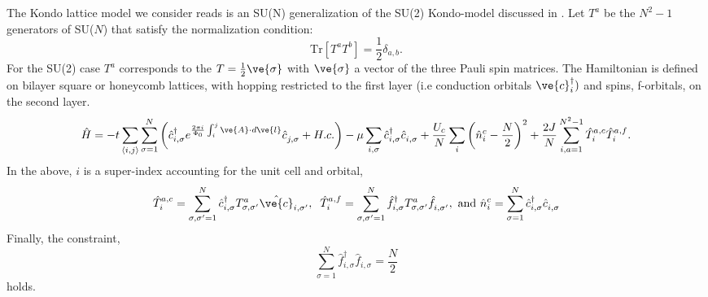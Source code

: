 

The Kondo lattice model we consider reads is an SU(N) generalization of the SU(2) Kondo-model   discussed in \cite{Capponi00,Assaad99a}.   Let 
$T^{a}$ be the  $N^2 -1  $ generators of SU($N$)   that  satisfy the normalization condition: 
\begin{equation}
	\text{Tr}  \left[ T^{a} T^{b} \right]   = \frac{1}{2}\delta_{a,b}.
\label{Normalization_condition.eq}
\end{equation}
For the SU(2) case $T^{a}$  corresponds to the $T  = \frac{1}{2} \ve{\sigma}$ with $\ve{\sigma}$   a vector of the three Pauli spin matrices.      The   Hamiltonian is defined on bilayer  square or honeycomb lattices, with  hopping restricted to the  first layer  (i.e  conduction orbitals $\ve{c}^{\dagger}_{i}  )$   and  spins, f-orbitals, on the second layer. 
\begin{equation}
	\hat{H}     =   - t  \sum_{\langle i,j \rangle}    \sum_{\sigma=1}^{N}  \left(  \hat{c}^{\dagger}_{i,\sigma}  e^{\frac{2\pi i}{\Phi_0}  \int_{i}^{j} \ve{A}\cdot d \ve{l}}\hat{c}^{\phantom\dagger}_{j,\sigma}   + H.c.  \right)  - \mu \sum_{i,\sigma} \hat{c}^{\dagger}_{i,\sigma}  \hat{c}^{\phantom\dagger}_{i,\sigma} 
	+    \frac{U_c}{N}  \sum_{i}   \left( \hat{n}^c_i -  \frac{N}{2} \right)^2  
         +  \frac{2 J}{N} \sum_{i, a=1  }^{N^2 -1}  \hat{T}^{a,c}_{i}  \hat{T}^{a,f}_{i}. 
\label{Kondo_SUN_Ham.eq}
\end{equation}
In the above,  $i$ is a super-index  accounting for the unit cell and orbital,
\begin{equation}
	 \hat{T}^{a,c}_{i}   =   \sum_{\sigma,\sigma'=1}^{N} \hat{c}^{\dagger}_{i,\sigma}T^{a}_{\sigma,\sigma'}  \hat{\ve{c}}^{\phantom\dagger}_{i,\sigma'}, \; \; 
	  \hat{T}^{a,f}_{i}   = \sum_{\sigma,\sigma'=1}^{N} \hat{f}^{\dagger}_{i,\sigma} T^{a}_{\sigma,\sigma'}  \hat{f}^{\phantom\dagger}_{i,\sigma'},  
	  \text{   and  }   \hat{n}^c_i  = \sum_{\sigma=1}^{N} \hat{c}_{i,\sigma}^{\dagger} \hat{c}_{i,\sigma}^{\phantom\dagger} 
\end{equation}
Finally, the constraint, 
\begin{equation}
   \sum_{\sigma=1}^{N}  \hat{f}^{\dagger}_{i,\sigma}   \hat{f}^{\phantom\dagger}_{i,\sigma}     = \frac{N}{2}
\end{equation}
holds.


